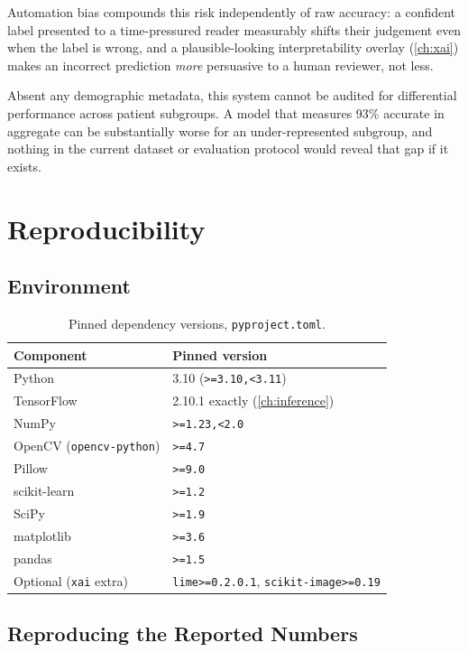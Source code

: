\documentclass[11pt,a4paper,oneside]{report}
\newcommand{\code}[1]{\texttt{\small #1}}
\begin{document}
Automation bias compounds this risk independently of raw accuracy: a
confident label presented to a time-pressured reader measurably shifts their
judgement even when the label is wrong, and a plausible-looking
interpretability overlay (\cref{ch:xai}) makes an incorrect prediction
\emph{more} persuasive to a human reviewer, not less.

Absent any demographic metadata, this system cannot be audited for
differential performance across patient subgroups. A model that measures 93\%
accurate in aggregate can be substantially worse for an under-represented
subgroup, and nothing in the current dataset or evaluation protocol would
reveal that gap if it exists.

\chapter{Reproducibility}
\label{ch:reproducibility}

\section{Environment}

\begin{table}[h]
\centering
\small
\begin{tabular}{@{}ll@{}}
\toprule
\textbf{Component} & \textbf{Pinned version} \\
\midrule
Python & 3.10 (\code{>=3.10,<3.11}) \\
TensorFlow & 2.10.1 exactly (\cref{ch:inference}) \\
NumPy & \code{>=1.23,<2.0} \\
OpenCV (\code{opencv-python}) & \code{>=4.7} \\
Pillow & \code{>=9.0} \\
scikit-learn & \code{>=1.2} \\
SciPy & \code{>=1.9} \\
matplotlib & \code{>=3.6} \\
pandas & \code{>=1.5} \\
Optional (\code{xai} extra) & \code{lime>=0.2.0.1}, \code{scikit-image>=0.19} \\
\bottomrule
\end{tabular}
\caption{Pinned dependency versions, \texttt{pyproject.toml}.}
\label{tab:deps}
\end{table}

\section{Reproducing the Reported Numbers}
\end{document}

